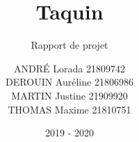 \documentclass[report]{BetterDocument}
\title{Taquin}
\subtitle{Rapport de projet}
\author{
	ANDRÉ Lorada 21809742\\
	DEROUIN Auréline 21806986\\
	MARTIN Justine 21909920\\
	THOMAS Maxime 21810751
}
\date{2019 - 2020}
\institute{Unicaen}
\begin{document}
	\pageDeGarde

	\tableDesMatieres

	

	

	

	

	
\end{document}
